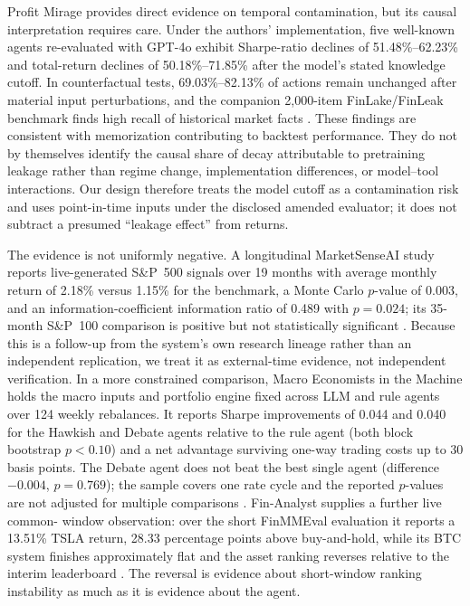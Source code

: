Profit Mirage provides direct evidence on temporal contamination, but its
causal interpretation requires care.  Under the authors' implementation, five
well-known agents re-evaluated with GPT-4o exhibit Sharpe-ratio declines of
51.48\%--62.23\% and total-return declines of 50.18\%--71.85\% after the
model's stated knowledge cutoff.  In counterfactual tests, 69.03\%--82.13\% of
actions remain unchanged after material input perturbations, and the companion
2,000-item FinLake/FinLeak benchmark finds high recall of historical market
facts \citep{li2025profitmirage}.  These findings are consistent with
memorization contributing to backtest performance.  They do not by themselves
identify the causal share of decay attributable to pretraining leakage rather
than regime change, implementation differences, or model--tool interactions.
Our design therefore treats the model cutoff as a contamination risk and uses
point-in-time inputs under the disclosed amended evaluator; it does not subtract a presumed ``leakage effect''
from returns.

The evidence is not uniformly negative.  A longitudinal MarketSenseAI study
reports live-generated S\&P~500 signals over 19 months with average monthly
return of 2.18\% versus 1.15\% for the benchmark, a Monte Carlo
\(p\)-value of 0.003, and an information-coefficient information ratio of
0.489 with \(p=0.024\); its 35-month S\&P~100 comparison is positive but not
statistically significant \citep{FatourosMetaxas2026SignalOrNoise}.  Because this is a
follow-up from the system's own research lineage rather than an independent
replication, we treat it as external-time evidence, not independent
verification.  In a more constrained comparison, Macro Economists in the
Machine holds the macro inputs and portfolio engine fixed across LLM and rule
agents over 124 weekly rebalances.  It reports Sharpe improvements of 0.044 and
0.040 for the Hawkish and Debate agents relative to the rule agent (both block
bootstrap \(p<0.10\)) and a net advantage surviving one-way trading costs up
to 30 basis points.  The Debate agent does not beat the best single agent
(difference \(-0.004\), \(p=0.769\)); the sample covers one rate cycle and the
reported \(p\)-values are not adjusted for multiple comparisons
\citep{wang2026macroeconomists}.  Fin-Analyst supplies a further live common-
window observation: over the short FinMMEval evaluation it reports a 13.51\%
TSLA return, 28.33 percentage points above buy-and-hold, while its BTC system
finishes approximately flat and the asset ranking reverses relative to the
interim leaderboard \citep{rashid2026finanalyst}.  The reversal is evidence
about short-window ranking instability as much as it is evidence about the
agent.

